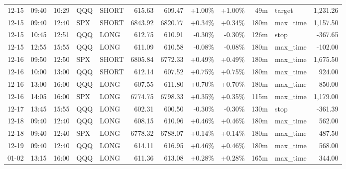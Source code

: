 \documentclass[11pt,a4paper,twoside]{article}
\begin{document}
\begin{center}
\begin{longtable}{>{\color{txtmain}}l l l l l r r r r r >{\color{txtmain}}l r}
12-15 & 09:40 & 10:29 & QQQ & SHORT & 615.63 & 609.47 & \textcolor{wingreen}{+1.00\%} & \textcolor{wingreen}{+1.00\%} & 49m & target & \textcolor{wingreen}{1,231.26} \\
12-15 & 09:40 & 12:40 & SPX & SHORT & 6843.92 & 6820.77 & \textcolor{wingreen}{+0.34\%} & \textcolor{wingreen}{+0.34\%} & 180m & max\_time & \textcolor{wingreen}{1,157.50} \\
12-15 & 10:45 & 12:51 & QQQ & LONG & 612.75 & 610.91 & \textcolor{lossred}{-0.30\%} & \textcolor{lossred}{-0.30\%} & 126m & stop & \textcolor{lossred}{-367.65} \\
12-15 & 12:55 & 15:55 & QQQ & LONG & 611.09 & 610.58 & \textcolor{lossred}{-0.08\%} & \textcolor{lossred}{-0.08\%} & 180m & max\_time & \textcolor{lossred}{-102.00} \\
12-16 & 09:50 & 12:50 & SPX & SHORT & 6805.84 & 6772.33 & \textcolor{wingreen}{+0.49\%} & \textcolor{wingreen}{+0.49\%} & 180m & max\_time & \textcolor{wingreen}{1,675.50} \\
12-16 & 10:00 & 13:00 & QQQ & SHORT & 612.14 & 607.52 & \textcolor{wingreen}{+0.75\%} & \textcolor{wingreen}{+0.75\%} & 180m & max\_time & \textcolor{wingreen}{924.00} \\
12-16 & 13:00 & 16:00 & QQQ & LONG & 607.55 & 611.80 & \textcolor{wingreen}{+0.70\%} & \textcolor{wingreen}{+0.70\%} & 180m & max\_time & \textcolor{wingreen}{850.00} \\
12-16 & 14:05 & 16:00 & SPX & LONG & 6774.75 & 6798.33 & \textcolor{wingreen}{+0.35\%} & \textcolor{wingreen}{+0.35\%} & 115m & max\_time & \textcolor{wingreen}{1,179.00} \\
12-17 & 13:45 & 15:55 & QQQ & LONG & 602.31 & 600.50 & \textcolor{lossred}{-0.30\%} & \textcolor{lossred}{-0.30\%} & 130m & stop & \textcolor{lossred}{-361.39} \\
12-18 & 09:40 & 12:40 & QQQ & LONG & 608.15 & 610.96 & \textcolor{wingreen}{+0.46\%} & \textcolor{wingreen}{+0.46\%} & 180m & max\_time & \textcolor{wingreen}{562.00} \\
12-18 & 09:40 & 12:40 & SPX & LONG & 6778.32 & 6788.07 & \textcolor{wingreen}{+0.14\%} & \textcolor{wingreen}{+0.14\%} & 180m & max\_time & \textcolor{wingreen}{487.50} \\
12-19 & 09:40 & 12:40 & QQQ & LONG & 614.11 & 616.95 & \textcolor{wingreen}{+0.46\%} & \textcolor{wingreen}{+0.46\%} & 180m & max\_time & \textcolor{wingreen}{568.00} \\
01-02 & 13:15 & 16:00 & QQQ & LONG & 611.36 & 613.08 & \textcolor{wingreen}{+0.28\%} & \textcolor{wingreen}{+0.28\%} & 165m & max\_time & \textcolor{wingreen}{344.00} \\

\end{longtable}
\end{center}
\end{document}

